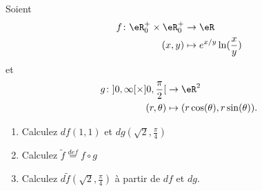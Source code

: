 
\begin{exercice}\label{exo0050}


Soient
\begin{equation}
	\begin{aligned}
		f\colon \eR^+_0\times\eR^+_0&\to \eR \\
		(x,y)&\mapsto  e^{x/y}\ln(\frac{ x }{ y }) 
	\end{aligned}
\end{equation}
et
\begin{equation}
	\begin{aligned}
		g\colon ]0,\infty[\times]0,\frac{ \pi }{ 2 }[&\to \eR^2 \\
		(r,\theta)&\mapsto (r\cos(\theta),r\sin(\theta)). 
	\end{aligned}
\end{equation}

\begin{enumerate}
\item
Calculez $df(1,1)$ et $dg(\sqrt{2},\frac{\pi}{4}) $
\item
Calculez $\tilde{f} \stackrel{def}= f \circ g$
\item
Calculez $d\tilde{f} (\sqrt{2},\frac{\pi}{4})$ à partir de $df$ et $dg$.
\end{enumerate}


\end{exercice}
